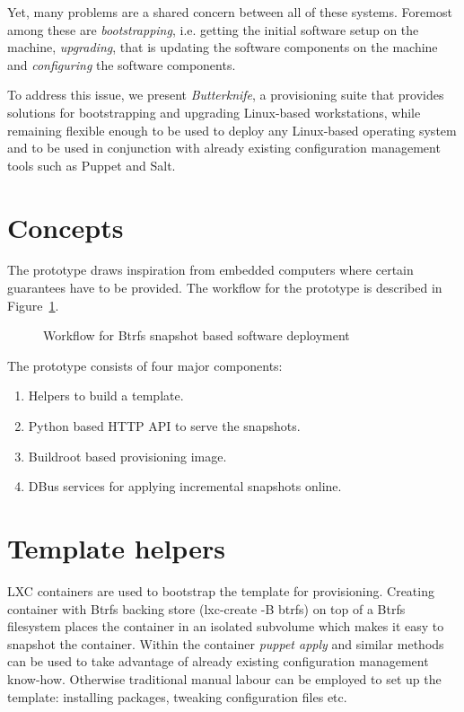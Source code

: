 \documentclass[a4paper,11pt]{kth-mag}
\begin{document}
Yet, many problems are a shared concern between all of these systems.
Foremost among these are \emph{bootstrapping}, i.e. getting
the initial software setup on the machine,
\emph{upgrading}, that is updating the software components on the machine and
\emph{configuring} the software components.

To address this issue, we present \emph{Butterknife},
a provisioning suite that provides solutions for bootstrapping and
upgrading Linux-based workstations, while remaining flexible enough
to be used to deploy any Linux-based operating system
and to be used in conjunction with already existing
configuration management tools such as Puppet and Salt.

\clearpage

\section{Concepts}
\label{sec:concepts}

The prototype draws inspiration from embedded computers
where certain guarantees have to be provided.
The workflow for the prototype is described in
Figure~\ref{fig:butterknife-workflow}.\\

\begin{figure}[!htb]
\centering
\scalebox{0.6}{}
\caption{Workflow for Btrfs snapshot based software deployment}
\label{fig:butterknife-workflow}
\end{figure}

\noindent The prototype consists of four major components:

\begin{enumerate}
\item Helpers to build a template.
\item Python based HTTP API to serve the snapshots.
\item Buildroot based provisioning image.
\item DBus services for applying incremental snapshots online.
\end{enumerate}

\clearpage

\section{Template helpers}

LXC containers are used to bootstrap the template for provisioning.
Creating container with Btrfs backing store (lxc-create -B btrfs)
on top of a Btrfs filesystem places the container in an
isolated subvolume which makes it easy to snapshot the container.
Within the container \emph{puppet apply} and similar methods can be used
to take advantage of already existing configuration management know-how.
Otherwise traditional manual labour can be employed to set up the template: installing packages, tweaking configuration files etc.
\end{document}

